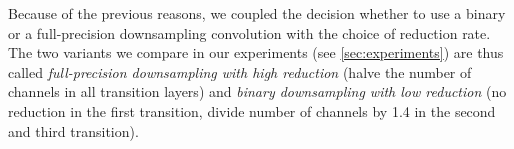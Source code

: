 \documentclass[10pt,twocolumn,letterpaper]{article}
\newcommand{\architecture}[1]{\emph{#1}}
\begin{document}
Because of the previous reasons, we coupled the decision whether to use a binary or a full-precision downsampling convolution with the choice of reduction rate.
The two variants we compare in our experiments (see \autoref{sec:experiments}) are thus called \emph{full-precision downsampling with high reduction} (halve the number of channels in all transition layers) and \emph{binary downsampling with low reduction} (no reduction in the first transition, divide number of channels by 1.4 in the second and third transition).

\end{document}
